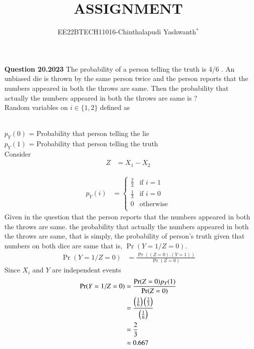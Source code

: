 \documentclass[journal,12pt,twocolumn]{IEEEtran}
\theoremstyle{remark}
\begin{document}

\vspace{3cm}

\title{ASSIGNMENT}
\author{EE22BTECH11016-Chinthalapudi Yashwanth$^{*}$%
}
\maketitle
\newpage
\bigskip
\renewcommand{\thefigure}{\theenumi}
\renewcommand{\thetable}{\theenumi}

\textbf{Question 20.2023}
The probability of a person telling the truth is 4/6 . An unbiased die is thrown by
the same person twice and the person reports that the numbers appeared in both
the throws are same. Then the probability that actually the numbers appeared in
both the throws are same is ?\\
\solution
Random variables on $i \in \{1,2\} $ defined as
\begin{table}[!ht]
	
\end{table}\\
$p_Y(0)$ = Probability that person telling the lie\\
$p_Y(1)$ = Probability that person telling the truth\\
Consider
\begin{align}
Z&=X_1-X_2
\end{align}
\begin{table}[!ht]
	
\end{table}
\begin{align}
p_Y(i) &= \begin{cases}
	    \frac{2}{3} & \text{if } i = 1\\
	    \frac{1}{3} & \text{if } i = 0\\
	    0 & \text{otherwise}\\
          \end{cases}
\end{align}
Given in the question that the person reports that the numbers appeared in both
the throws are same. the probability that actually the numbers appeared in
both the throws are same, that is simply, the probability of person's truth given that numbers on both dice are same that is, $\Pr(Y=1 / Z=0)$.
\begin{align} 
\Pr(Y=1 / Z=0) &= \frac{\Pr((Z=0) . (Y=1))}{\Pr(Z=0)}
\end{align}
Since $X_i$ and $Y$ are independent events
\begin{align}
\Pr(Y=1 / Z=0) &= \frac{\Pr(Z=0)p_Y(1)}{\Pr(Z=0)}\\
             &= \frac{\left(\frac{1}{6}\right) \left(\frac{2}{3}\right)}{\left(\frac{1}{6}\right)}\\
&= \frac{2}{3}\\
&\approx 0.667
\end{align}
\end{document}

